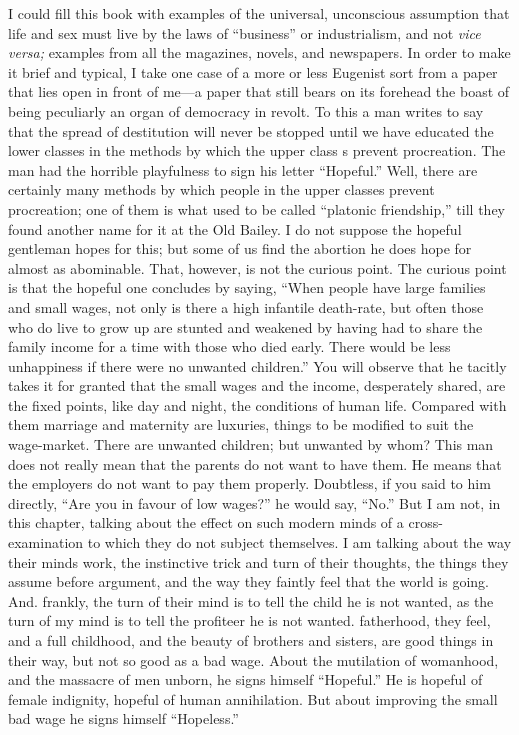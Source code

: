 \documentclass{book}
\begin{document}
I could fill this book with examples of the universal, unconscious assumption that life and sex must live by the laws of “business” or industrialism, and not \emph{vice versa;} examples from all the magazines, novels, and newspapers. In order to make it brief and typical, I take one case of a more or less Eugenist sort from a paper that lies open in front of me—a paper that still bears on its forehead the boast of being peculiarly an organ of democracy in revolt. To this a man writes to say that the spread of destitution will never be stopped until we have educated the lower classes in the methods by which the upper class s prevent procreation. The man had the horrible playfulness to sign his letter “Hopeful.” Well, there are certainly many methods by which people in the upper classes prevent procreation; one of them is what used to be called “platonic friendship,” till they found another name for it at the Old Bailey. I do not suppose the hopeful gentleman hopes for this; but some of us find the abortion he does hope for almost as abominable. That, however, is not the curious point. The curious point is that the hopeful one concludes by saying, “When people have large families and small wages, not only is there a high infantile death-rate, but often those who do live to grow up are stunted and weakened by having had to share the family income for a time with those who died early. There would be less unhappiness if there were no unwanted children.” You will observe that he tacitly takes it for granted that the small wages and the income, desperately shared, are the fixed points, like day and night, the conditions of human life. Compared with them marriage and maternity are luxuries, things to be modified to suit the wage-market. There are unwanted children; but unwanted by whom? This man does not really mean that the parents do not want to have them. He means that the employers do not want to pay them properly. Doubtless, if you said to him directly, “Are you in favour of low wages?” he would say, “No.” But I am not, in this chapter, talking about the effect on such modern minds of a cross-examination to which they do not subject themselves. I am talking about the way their minds work, the instinctive trick and turn of their thoughts, the things they assume before argument, and the way they faintly feel that the world is going. And. frankly, the turn of their mind is to tell the child he is not wanted, as the turn of my mind is to tell the profiteer he is not wanted. fatherhood, they feel, and a full childhood, and the beauty of brothers and sisters, are good things in their way, but not so good as a bad wage. About the mutilation of womanhood, and the massacre of men unborn, he signs himself “Hopeful.” He is hopeful of female indignity, hopeful of human annihilation. But about improving the small bad wage he signs himself “Hopeless.”
\end{document}
